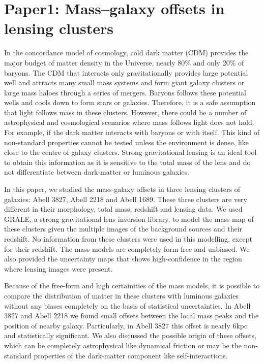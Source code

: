 \chapter{Paper1: Mass–galaxy offsets in lensing clusters}\label{paper:massgalaxyoffsets}

In the concordance model of cosmology, cold dark matter (CDM) provides the major
budget of matter density in the Universe, nearly 80$\%$ and only 20$\%$ of baryons. 
The CDM that interacts only gravitationally provides large potential well and 
attracts many small mass systems and form giant galaxy clusters or large
mass haloes through a series of mergers. Baryons follows these potential wells
and cools down to form stars or galaxies. Therefore, it is a safe assumption
that light follows mass in these clusters. However, there could be a number of
astrophysical and cosmological scenarios where mass follows light does not hold. 
For example, if the dark matter interacts with baryons or with itself. This
kind of non-standard properties cannot be tested unless the environment is dense,
like close to the centre of galaxy clusters. Strong gravitational lensing is 
an ideal tool to obtain this information as it is sensitive to the total
mass of the lens and do not differentiate between dark-matter or luminous
galaxies. 

In this paper, we studied the mass-galaxy offsets in three lensing clusters of galaxies:
Abell 3827, Abell 2218 and Abell 1689. These three clusters are very different in 
their morphology, total mass, redshift and lensing data. We used GRALE, a strong
gravitational lens inversion library, to model the mass map of these clusters given
the multiple images of the background sources and their redshift. No information
from these clusters were used in this modelling, except for their redshift. The
mass models are completely form free and unbiased. We also provided the uncertainty
maps that shows high-confidence in the region where lensing images were present. 


Because of the free-form and high certainities of the mass models, 
it is possible to compare the distribution
of matter in these clusters with luminous galaxies without any biases 
completely on the basis of statistical uncertainties. In Abell 3827 and
Abell 2218 we found small offsets between the local mass peaks and the
position of nearby galaxy. Particularly, in Abell 3827 this offset is nearly 6kpc
and statistically significant. We also discussed the possible origin 
of these offsets, which can be completely astrophysical like dynamical
friction or may be the non-standard properties of the dark-matter component like
self-interactions. 

